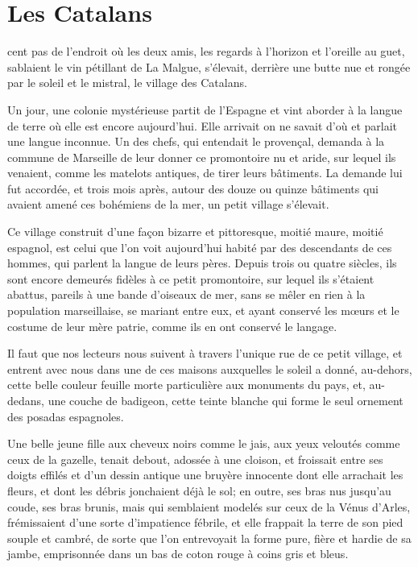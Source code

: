 \chapter{Les Catalans}

\lettrine{}{} cent pas de l'endroit où les deux amis, les regards à l'horizon et l'oreille au guet, sablaient le vin pétillant de La Malgue, s'élevait, derrière une butte nue et rongée par le soleil et le mistral, le village des Catalans.

Un jour, une colonie mystérieuse partit de l'Espagne et vint aborder à la langue de terre où elle est encore aujourd'hui. Elle arrivait on ne savait d'où et parlait une langue inconnue. Un des chefs, qui entendait le provençal, demanda à la commune de Marseille de leur donner ce promontoire nu et aride, sur lequel ils venaient, comme les matelots antiques, de tirer leurs bâtiments. La demande lui fut accordée, et trois mois après, autour des douze ou quinze bâtiments qui avaient amené ces bohémiens de la mer, un petit village s'élevait.

Ce village construit d'une façon bizarre et pittoresque, moitié maure, moitié espagnol, est celui que l'on voit aujourd'hui habité par des descendants de ces hommes, qui parlent la langue de leurs pères. Depuis trois ou quatre siècles, ils sont encore demeurés fidèles à ce petit promontoire, sur lequel ils s'étaient abattus, pareils à une bande d'oiseaux de mer, sans se mêler en rien à la population marseillaise, se mariant entre eux, et ayant conservé les mœurs et le costume de leur mère patrie, comme ils en ont conservé le langage.

Il faut que nos lecteurs nous suivent à travers l'unique rue de ce petit village, et entrent avec nous dans une de ces maisons auxquelles le soleil a donné, au-dehors, cette belle couleur feuille morte particulière aux monuments du pays, et, au-dedans, une couche de badigeon, cette teinte blanche qui forme le seul ornement des posadas espagnoles.

Une belle jeune fille aux cheveux noirs comme le jais, aux yeux veloutés comme ceux de la gazelle, tenait debout, adossée à une cloison, et froissait entre ses doigts effilés et d'un dessin antique une bruyère innocente dont elle arrachait les fleurs, et dont les débris jonchaient déjà le sol; en outre, ses bras nus jusqu'au coude, ses bras brunis, mais qui semblaient modelés sur ceux de la Vénus d'Arles, frémissaient d'une sorte d'impatience fébrile, et elle frappait la terre de son pied souple et cambré, de sorte que l'on entrevoyait la forme pure, fière et hardie de sa jambe, emprisonnée dans un bas de coton rouge à coins gris et bleus.

